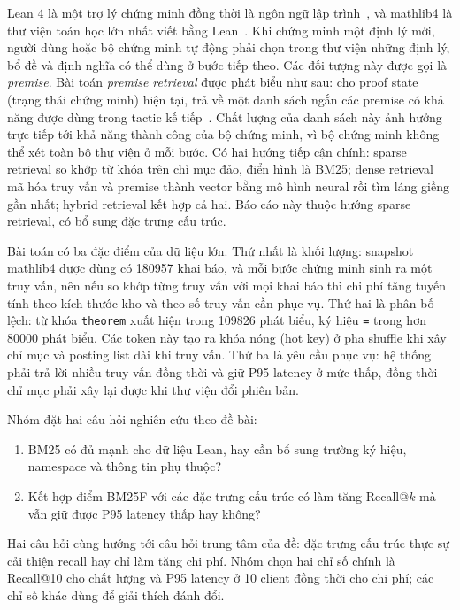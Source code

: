 \documentclass[11pt,a4paper,oneside]{report}
\newcommand{\code}[1]{\texttt{#1}}
\begin{document}
Lean 4 là một trợ lý chứng minh đồng thời là ngôn ngữ lập trình~\cite{demoura2021}, và mathlib4 là thư viện toán học
lớn nhất viết bằng Lean~\cite{mathlib2020}. Khi chứng minh một định lý mới, người dùng hoặc bộ chứng minh tự động phải
chọn trong thư viện những định lý, bổ đề và định nghĩa có thể dùng ở bước tiếp theo. Các đối tượng này được gọi là
\emph{premise}. Bài toán \emph{premise retrieval} được phát biểu như sau: cho proof state (trạng thái chứng minh) hiện
tại, trả về một danh sách ngắn các premise có khả năng được dùng trong tactic kế tiếp~\cite{yang2023}. Chất lượng của danh
sách này ảnh hưởng trực tiếp tới khả năng thành công của bộ chứng minh, vì bộ chứng minh không thể xét toàn bộ thư viện ở
mỗi bước. Có hai hướng tiếp cận chính: sparse retrieval so khớp từ khóa trên chỉ mục đảo, điển hình là BM25; dense
retrieval mã hóa truy vấn và premise thành vector bằng mô hình neural rồi tìm láng giềng gần nhất; hybrid retrieval kết
hợp cả hai. Báo cáo này thuộc hướng sparse retrieval, có bổ sung đặc trưng cấu trúc.

Bài toán có ba đặc điểm của dữ liệu lớn. Thứ nhất là khối lượng: snapshot mathlib4 được dùng có \num{180957} khai báo,
và mỗi bước chứng minh sinh ra một truy vấn, nên nếu so khớp từng truy vấn với mọi khai báo thì chi phí tăng tuyến tính
theo kích thước kho và theo số truy vấn cần phục vụ. Thứ hai là phân bố lệch: từ khóa \code{theorem} xuất hiện trong
\num{109826} phát biểu, ký hiệu \code{=} trong hơn \num{80000} phát biểu. Các token này tạo ra khóa nóng (hot key) ở pha
shuffle khi xây chỉ mục và posting list dài khi truy vấn. Thứ ba là yêu cầu phục vụ: hệ thống phải trả lời nhiều truy vấn
đồng thời và giữ P95 latency ở mức thấp, đồng thời chỉ mục phải xây lại được khi thư viện đổi phiên bản.

Nhóm đặt hai câu hỏi nghiên cứu theo đề bài:
\begin{enumerate}[label=\textbf{RQ\arabic*.},leftmargin=*]
  \item BM25 có đủ mạnh cho dữ liệu Lean, hay cần bổ sung trường ký hiệu, namespace và thông tin phụ thuộc?
  \item Kết hợp điểm BM25F với các đặc trưng cấu trúc có làm tăng Recall@$k$ mà vẫn giữ được P95 latency thấp hay không?
\end{enumerate}
Hai câu hỏi cùng hướng tới câu hỏi trung tâm của đề: đặc trưng cấu trúc thực sự cải thiện recall hay chỉ làm tăng chi
phí. Nhóm chọn hai chỉ số chính là Recall@10 cho chất lượng và P95 latency ở 10 client đồng thời cho chi phí; các chỉ số
khác dùng để giải thích đánh đổi.
\end{document}
